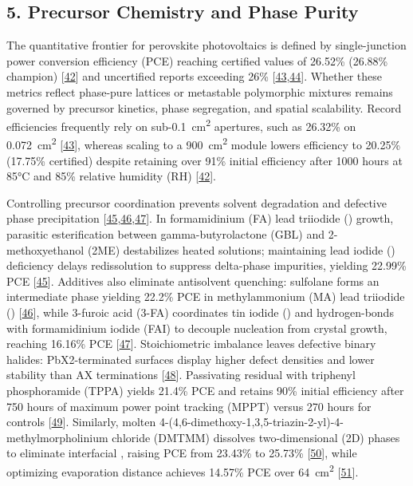 \documentclass[
  11pt,
]{article}
\begin{document}
\subsection{5. Precursor Chemistry and Phase
Purity}\label{precursor-chemistry-and-phase-purity}

The quantitative frontier for perovskite photovoltaics is defined by
single-junction power conversion efficiency (PCE) reaching certified
values of 26.52\% (26.88\% champion)
{[}\href{https://doi.org/10.1126/sciadv.aed6327}{42}{]} and uncertified
reports exceeding 26\%
{[}\href{https://doi.org/10.1002/advs.76508}{43},\href{https://doi.org/10.26434/chemrxiv.15006632/v1}{44}{]}.
Whether these metrics reflect phase-pure lattices or metastable
polymorphic mixtures remains governed by precursor kinetics, phase
segregation, and spatial scalability. Record efficiencies frequently
rely on sub-\qty{0.1}{\centi\meter\squared} apertures, such as 26.32\%
on \qty{0.072}{\centi\meter\squared}
{[}\href{https://doi.org/10.1002/advs.76508}{43}{]}, whereas scaling to
a \qty{900}{\centi\meter\squared} module lowers efficiency to 20.25\%
(17.75\% certified) despite retaining over 91\% initial efficiency after
1000 hours at 85°C and 85\% relative humidity (RH)
{[}\href{https://doi.org/10.1126/sciadv.aed6327}{42}{]}.

Controlling precursor coordination prevents solvent degradation and
defective phase precipitation
{[}\href{https://doi.org/10.1021/jacs.6c05502}{45},\href{https://doi.org/10.1021/acsaem.6c01764}{46},\href{https://doi.org/10.1002/adfm.76731}{47}{]}.
In formamidinium (FA) lead triiodide () growth, parasitic
esterification between gamma-butyrolactone (GBL) and 2-methoxyethanol
(2ME) destabilizes heated solutions; maintaining lead iodide ()
deficiency delays redissolution to suppress delta-phase impurities,
yielding 22.99\% PCE
{[}\href{https://doi.org/10.1021/jacs.6c05502}{45}{]}. Additives also
eliminate antisolvent quenching: sulfolane forms an intermediate phase
yielding 22.2\% PCE in methylammonium (MA) lead triiodide ()
{[}\href{https://doi.org/10.1021/acsaem.6c01764}{46}{]}, while 3-furoic
acid (3-FA) coordinates tin iodide () and hydrogen-bonds with
formamidinium iodide (FAI) to decouple nucleation from crystal growth,
reaching 16.16\% PCE
{[}\href{https://doi.org/10.1002/adfm.76731}{47}{]}. Stoichiometric
imbalance leaves defective binary halides: PbX2-terminated surfaces
display higher defect densities and lower stability than AX terminations
{[}\href{https://doi.org/10.1021/acsnano.6c08922}{48}{]}. Passivating
residual  with triphenyl phosphoramide (TPPA) yields 21.4\% PCE
and retains 90\% initial efficiency after 750 hours of maximum power
point tracking (MPPT) versus 270 hours for controls
{[}\href{https://doi.org/10.1021/acsaem.6c01370}{49}{]}. Similarly,
molten 4-(4,6-dimethoxy-1,3,5-triazin-2-yl)-4-methylmorpholinium
chloride (DMTMM) dissolves two-dimensional (2D) phases to eliminate
interfacial , raising PCE from 23.43\% to 25.73\%
{[}\href{https://doi.org/10.1002/adfm.76974}{50}{]}, while optimizing
 evaporation distance achieves 14.57\% PCE over
\qty{64}{\centi\meter\squared}
{[}\href{https://doi.org/10.1002/solr.70430}{51}{]}.
\end{document}
